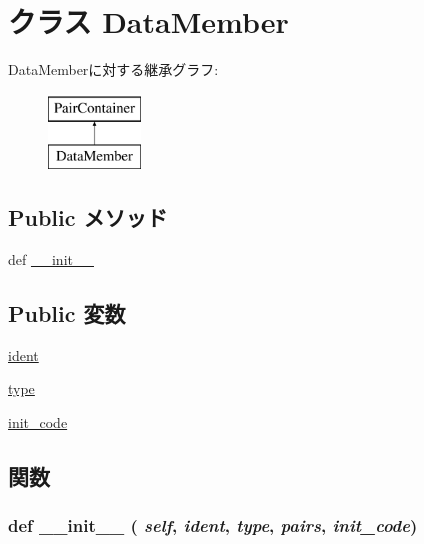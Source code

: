 \hypertarget{classslicc_1_1symbols_1_1Type_1_1DataMember}{
\section{クラス DataMember}
\label{classslicc_1_1symbols_1_1Type_1_1DataMember}
}
DataMemberに対する継承グラフ:\begin{figure}[H]
\begin{center}
\leavevmode
\includegraphics[height=2cm]{classslicc_1_1symbols_1_1Type_1_1DataMember}
\end{center}
\end{figure}
\subsection*{Public メソッド}
\begin{DoxyCompactItemize}
\item 
def \hyperlink{classslicc_1_1symbols_1_1Type_1_1DataMember_ac775ee34451fdfa742b318538164070e}{\_\-\_\-init\_\-\_\-}
\end{DoxyCompactItemize}
\subsection*{Public 変数}
\begin{DoxyCompactItemize}
\item 
\hyperlink{classslicc_1_1symbols_1_1Type_1_1DataMember_a2fe57e2d3d2cba9a3aeba2f629eaa78b}{ident}
\item 
\hyperlink{classslicc_1_1symbols_1_1Type_1_1DataMember_a7aead736a07eaf25623ad7bfa1f0ee2d}{type}
\item 
\hyperlink{classslicc_1_1symbols_1_1Type_1_1DataMember_ad273ab1031f90e75747a4fbdeca02eed}{init\_\-code}
\end{DoxyCompactItemize}


\subsection{関数}
\hypertarget{classslicc_1_1symbols_1_1Type_1_1DataMember_ac775ee34451fdfa742b318538164070e}{
\subsubsection[{\_\-\_\-init\_\-\_\-}]{\setlength{\rightskip}{0pt plus 5cm}def \_\-\_\-init\_\-\_\- ( {\em self}, \/   {\em ident}, \/   {\em type}, \/   {\em pairs}, \/   {\em init\_\-code})}}
\label{classslicc_1_1symbols_1_1Type_1_1DataMember_ac775ee34451fdfa742b318538164070e}




